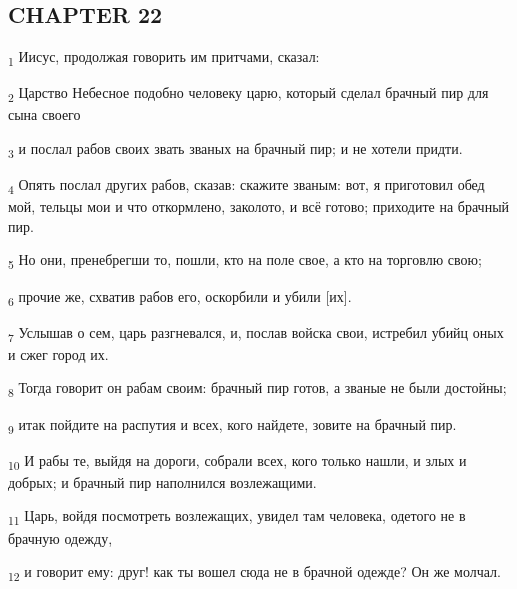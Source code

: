 \subsection{CHAPTER 22}
\begin{tcolorbox}
\textsubscript{1} Иисус, продолжая говорить им притчами, сказал:
\end{tcolorbox}
\begin{tcolorbox}
\textsubscript{2} Царство Небесное подобно человеку царю, который сделал брачный пир для сына своего
\end{tcolorbox}
\begin{tcolorbox}
\textsubscript{3} и послал рабов своих звать званых на брачный пир; и не хотели придти.
\end{tcolorbox}
\begin{tcolorbox}
\textsubscript{4} Опять послал других рабов, сказав: скажите званым: вот, я приготовил обед мой, тельцы мои и что откормлено, заколото, и всё готово; приходите на брачный пир.
\end{tcolorbox}
\begin{tcolorbox}
\textsubscript{5} Но они, пренебрегши то, пошли, кто на поле свое, а кто на торговлю свою;
\end{tcolorbox}
\begin{tcolorbox}
\textsubscript{6} прочие же, схватив рабов его, оскорбили и убили [их].
\end{tcolorbox}
\begin{tcolorbox}
\textsubscript{7} Услышав о сем, царь разгневался, и, послав войска свои, истребил убийц оных и сжег город их.
\end{tcolorbox}
\begin{tcolorbox}
\textsubscript{8} Тогда говорит он рабам своим: брачный пир готов, а званые не были достойны;
\end{tcolorbox}
\begin{tcolorbox}
\textsubscript{9} итак пойдите на распутия и всех, кого найдете, зовите на брачный пир.
\end{tcolorbox}
\begin{tcolorbox}
\textsubscript{10} И рабы те, выйдя на дороги, собрали всех, кого только нашли, и злых и добрых; и брачный пир наполнился возлежащими.
\end{tcolorbox}
\begin{tcolorbox}
\textsubscript{11} Царь, войдя посмотреть возлежащих, увидел там человека, одетого не в брачную одежду,
\end{tcolorbox}
\begin{tcolorbox}
\textsubscript{12} и говорит ему: друг! как ты вошел сюда не в брачной одежде? Он же молчал.
\end{tcolorbox}

